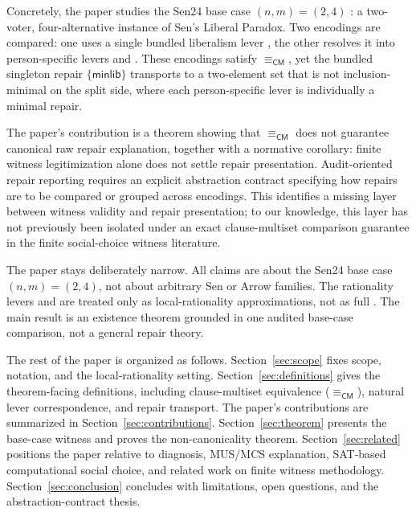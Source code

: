 Concretely, the paper studies the Sen24 base case \((n,m)=(2,4)\) \citep{sen1970}: a two-voter, four-alternative instance of Sen's Liberal Paradox.
Two encodings are compared: one uses a single bundled liberalism lever , the other resolves it into person-specific levers  and .
These encodings satisfy $\equiv_{\mathsf{CM}}$, yet the bundled singleton repair $\{\mathsf{minlib}\}$ transports to a two-element set that is not inclusion-minimal on the split side, where each person-specific lever is individually a minimal repair.

The paper's contribution is a theorem showing that $\equiv_{\mathsf{CM}}$ does not guarantee canonical raw repair explanation, together with a normative corollary: finite witness legitimization alone does not settle repair presentation.
Audit-oriented repair reporting requires an explicit abstraction contract specifying how repairs are to be compared or grouped across encodings.
This identifies a missing layer between witness validity and repair presentation; to our knowledge, this layer has not previously been isolated under an exact clause-multiset comparison guarantee in the finite social-choice witness literature.

The paper stays deliberately narrow.
All claims are about the Sen24 base case \((n,m)=(2,4)\), not about arbitrary Sen or Arrow families.
The rationality levers  and  are treated only as local-rationality approximations, not as full .
The main result is an existence theorem grounded in one audited base-case comparison, not a general repair theory.

The rest of the paper is organized as follows.
Section~\ref{sec:scope} fixes scope, notation, and the local-rationality setting.
Section~\ref{sec:definitions} gives the theorem-facing definitions, including clause-multiset equivalence ($\equiv_{\mathsf{CM}}$), natural lever correspondence, and repair transport.
The paper's contributions are summarized in Section~\ref{sec:contributions}.
Section~\ref{sec:theorem} presents the base-case witness and proves the non-canonicality theorem.
Section~\ref{sec:related} positions the paper relative to diagnosis, MUS/MCS explanation, SAT-based computational social choice, and related work on finite witness methodology.
Section~\ref{sec:conclusion} concludes with limitations, open questions, and the abstraction-contract thesis.
